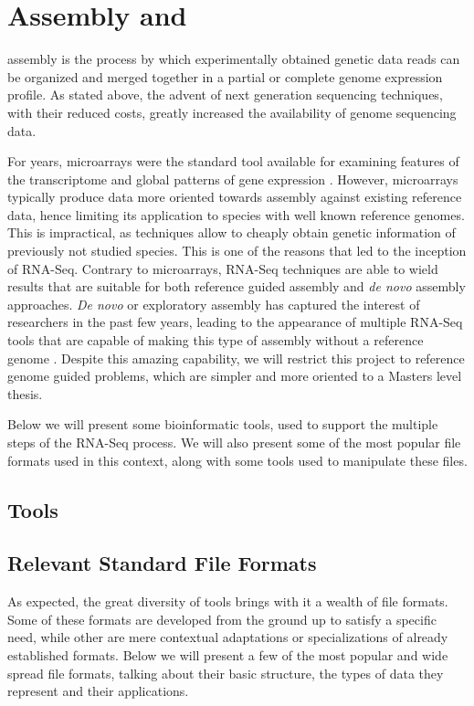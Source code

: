 \section{\Trans{} Assembly and \rnaseq}\label{sec:assembly}

\Trans{} assembly is the process by which experimentally obtained genetic data
reads can be organized and merged together in a partial or complete genome
expression profile. As stated above, the advent of next generation sequencing
techniques, with their reduced costs, greatly increased the availability of
genome sequencing data.

For years, microarrays were the standard tool available for examining features
of the transcriptome and global patterns of gene expression \cite{Wolf2013}.
However, microarrays typically produce data more oriented towards assembly
against existing reference data, hence limiting its application to species with
well known reference genomes. This is impractical, as \ngs{} techniques allow to
cheaply obtain genetic information of previously not studied species. This is
one of the reasons that led to the inception of RNA-Seq. Contrary to
microarrays, RNA-Seq techniques are able to wield results that are suitable for
both reference guided assembly and \textit{de novo} assembly approaches.
\textit{De novo} or exploratory assembly has captured the interest of
researchers in the past few years, leading to the appearance of multiple RNA-Seq
tools that are capable of making this type of assembly without a reference
genome \cite{nuno11:assemblathon}. Despite this amazing capability, we will
restrict this project to reference genome guided problems, which are simpler and
more oriented to a Masters level thesis.

Below we will present some bioinformatic tools, used to support the multiple
steps of the RNA-Seq process. We will also present some of the most popular file
formats used in this context, along with some tools used to manipulate these
files.

\subsection{\rnaseq{} Tools}\label{sec:seqtools}

\subsection{Relevant Standard File Formats}\label{sec:formats}

As expected, the great diversity of \rnaseq{} tools brings with it a wealth of
file formats. Some of these formats are developed from the ground up to satisfy
a specific need, while other are mere contextual adaptations or specializations
of already established formats. Below we will present a few of the most popular
and wide spread file formats, talking about their basic structure, the types of
data they represent and their applications.

